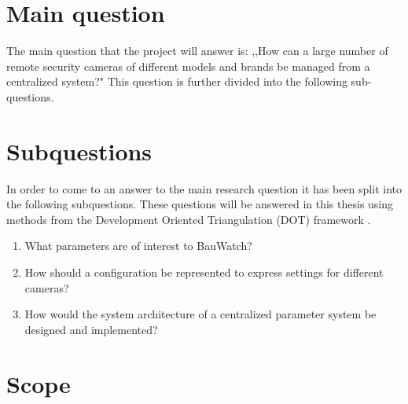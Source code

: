 \section{Main question}
The main question that the project will answer is: ,,How can a large number of remote security cameras of different models and brands be managed from a centralized system?"
This question is further divided into the following sub-questions.

\section{Subquestions}
In order to come to an answer to the main research question it has been split into the following subquestions.
These questions will be answered in this thesis using methods from the Development Oriented Triangulation (DOT) framework \cite{noauthor_dot_nodate}.
\begin{enumerate}
	\item What parameters are of interest to BauWatch?
	\item How should a configuration be represented to express settings for different cameras?
	\item How would the system architecture of a centralized parameter system be designed and implemented?
\end{enumerate}

\section{Scope}


